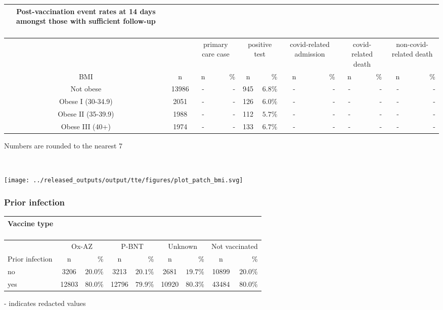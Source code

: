 \documentclass[
]{article}
\begin{document}
\captionsetup[table]{labelformat=empty,skip=1pt}
\begin{longtable}{cccrcrcrcrcr}
\caption*{
\large Post-vaccination event rates at 14 days amongst those with sufficient follow-up\\ 
\small \\ 
} \\ 
\toprule
& & \multicolumn{2}{c}{primary care case} & \multicolumn{2}{c}{positive test} & \multicolumn{2}{c}{covid-related admission} & \multicolumn{2}{c}{covid-related death} & \multicolumn{2}{c}{non-covid-related death} \\ 
 \cmidrule(lr){3-4}\cmidrule(lr){5-6}\cmidrule(lr){7-8}\cmidrule(lr){9-10}\cmidrule(lr){11-12}
BMI & n & n & \% & n & \% & n & \% & n & \% & n & \% \\ 
\midrule
Not obese & 13986 & - & - & 945 & $6.8\%$ & - & - & - & - & - & - \\ 
Obese I (30-34.9) & 2051 & - & - & 126 & $6.0\%$ & - & - & - & - & - & - \\ 
Obese II (35-39.9) & 1988 & - & - & 112 & $5.7\%$ & - & - & - & - & - & - \\ 
Obese III (40+) & 1974 & - & - & 133 & $6.7\%$ & - & - & - & - & - & - \\ 
\bottomrule
\end{longtable}
\begin{minipage}{\linewidth}
Numbers are rounded to the nearest 7\\ 
\end{minipage}

~ ~

\texttt{[image: ../released\_outputs/output/tte/figures/plot\_patch\_bmi.svg]}

\hypertarget{prior-infection}{%
\subsubsection{Prior infection}\label{prior-infection}}

\captionsetup[table]{labelformat=empty,skip=1pt}
\begin{longtable}{lcrcrcrcr}
\caption*{
\large Vaccine type\\ 
\small \\ 
} \\ 
\toprule
& \multicolumn{2}{c}{Ox-AZ} & \multicolumn{2}{c}{P-BNT} & \multicolumn{2}{c}{Unknown} & \multicolumn{2}{c}{Not vaccinated} \\ 
 \cmidrule(lr){2-3}\cmidrule(lr){4-5}\cmidrule(lr){6-7}\cmidrule(lr){8-9}
Prior infection & n & \% & n & \% & n & \% & n & \% \\ 
\midrule
no & 3206 & $20.0\%$ & 3213 & $20.1\%$ & 2681 & $19.7\%$ & 10899 & $20.0\%$ \\ 
yes & 12803 & $80.0\%$ & 12796 & $79.9\%$ & 10920 & $80.3\%$ & 43484 & $80.0\%$ \\ 
\bottomrule
\end{longtable}
\begin{minipage}{\linewidth}
- indicates redacted values\\ 
\end{minipage}
\end{document}
